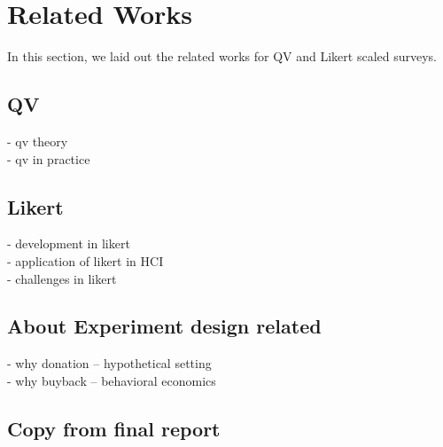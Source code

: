\section{Related Works} \label{related_works}
In this section, 
we laid out the related works for QV and Likert scaled surveys.

\subsection{QV}
- qv theory\\
- qv in practice \\

\subsection{Likert}
- development in likert \\
- application of likert in HCI\\
- challenges in likert \\

\subsection{About Experiment design related}
- why donation -- hypothetical setting\\
- why buyback -- behavioral economics

\subsection{Copy from final report }